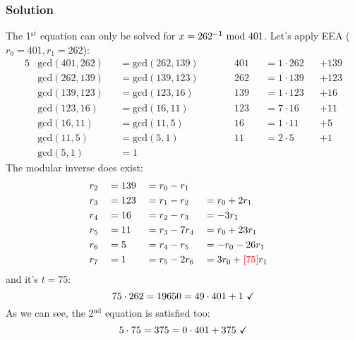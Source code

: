 \subsubsection*{Solution}
The 1$^\text{st}$ equation can only be solved for $x=262^{-1}\text{ mod }401$. Let's apply EEA ($r_0=401, r_1=262$):
\begin{alignat*}{5}
    &\text{gcd}(401,262)&&=\text{gcd}(262,139)\qquad&&401&&=1\cdot262&&+139\\
    &\text{gcd}(262,139)&&=\text{gcd}(139,123)\qquad&&262&&=1\cdot139&&+123\\
    &\text{gcd}(139,123)&&=\text{gcd}(123,16)\qquad&&139&&=1\cdot123&&+16\\
    &\text{gcd}(123,16)&&=\text{gcd}(16,11)\qquad&&123&&=7\cdot16&&+11\\
    &\text{gcd}(16,11)&&=\text{gcd}(11,5)\qquad&&16&&=1\cdot11&&+5\\
    &\text{gcd}(11,5)&&=\text{gcd}(5,1)\qquad&&11&&=2\cdot5&&+1\\
    &\text{gcd}(5,1)&&=1
\end{alignat*}
The modular inverse does exist:
\begin{alignat*}{4}
    &r_2&&=139&&=r_0-r_1\\
    &r_3&&=123&&=r_1-r_2&&=r_0+2r_1\\
    &r_4&&=16&&=r_2-r_3&&=-3r_1\\
    &r_5&&=11&&=r_3-7r_4&&=r_0+23r_1\\
    &r_6&&=5&&=r_4-r_5&&=-r_0-26r_1\\
    &r_7&&=1&&=r_5-2r_6&&=3r_0+\textcolor{red}{[75]}r_1
\end{alignat*}
and it's $t=75$:
$$75\cdot262=19650=49\cdot401+1\text{ \checkmark}$$
As we can see, the 2$^\text{nd}$ equation is satisfied too:
$$5\cdot75=375=0\cdot401+375\text{ \checkmark}$$

